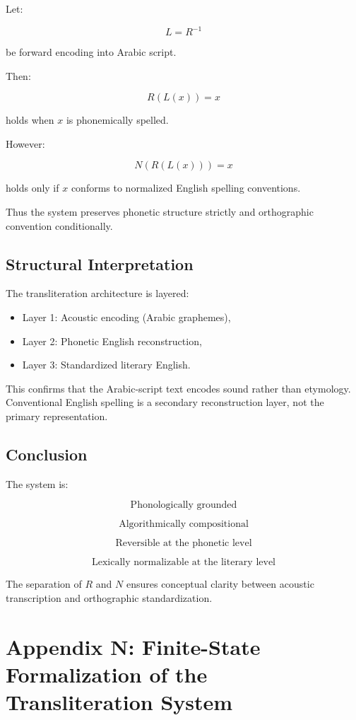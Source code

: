 \documentclass[12pt]{article}
\begin{document}
Let:

\[
L = R^{-1}
\]

be forward encoding into Arabic script.

Then:

\[
R(L(x)) = x
\]

holds when $x$ is phonemically spelled.

However:

\[
N(R(L(x))) = x
\]

holds only if $x$ conforms to normalized English spelling conventions.

Thus the system preserves phonetic structure strictly and orthographic convention conditionally.

\subsection{Structural Interpretation}

The transliteration architecture is layered:

\begin{itemize}
\item Layer 1: Acoustic encoding (Arabic graphemes),
\item Layer 2: Phonetic English reconstruction,
\item Layer 3: Standardized literary English.
\end{itemize}

This confirms that the Arabic-script text encodes sound rather than etymology. Conventional English spelling is a secondary reconstruction layer, not the primary representation.

\subsection{Conclusion}

The system is:

\[
\text{Phonologically grounded}
\]

\[
\text{Algorithmically compositional}
\]

\[
\text{Reversible at the phonetic level}
\]

\[
\text{Lexically normalizable at the literary level}
\]

The separation of $R$ and $N$ ensures conceptual clarity between acoustic transcription and orthographic standardization.

\section{Appendix N: Finite-State Formalization of the Transliteration System}
\end{document}
